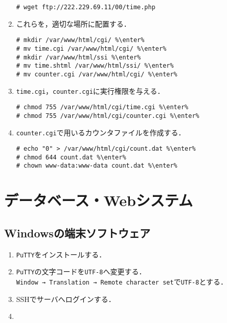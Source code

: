 \documentclass{jlreq}
\begin{document}
\begin{enumerate}
\begin{lstlisting}
# wget ftp://222.229.69.11/00/time.php
\end{lstlisting}
    \item これらを，適切な場所に配置する．
          \begin{lstlisting}
# mkdir /var/www/html/cgi/ %\enter%
# mv time.cgi /var/www/html/cgi/ %\enter%
# mkdir /var/www/html/ssi %\enter%
# mv time.shtml /var/www/html/ssi/ %\enter%
# mv counter.cgi /var/www/html/cgi/ %\enter%
\end{lstlisting}
    \item \texttt{time.cgi}，\texttt{counter.cgi}に実行権限を与える．
          \begin{lstlisting}
# chmod 755 /var/www/html/cgi/time.cgi %\enter%
# chmod 755 /var/www/html/cgi/counter.cgi %\enter%
\end{lstlisting}
    \item \texttt{counter.cgi}で用いるカウンタファイルを作成する．
          \begin{lstlisting}
# echo "0" > /var/www/html/cgi/count.dat %\enter%
# chmod 644 count.dat %\enter%
# chown www-data:www-data count.dat %\enter%
\end{lstlisting}
\end{enumerate}
\clearpage
\section{データベース・Webシステム}
\subsection{Windowsの端末ソフトウェア}
\begin{enumerate}
    \item \texttt{PuTTY}をインストールする．
    \item \texttt{PuTTY}の文字コードを\texttt{UTF-8}へ変更する．\\
          \texttt{Window → Translation → Remote character set}で\texttt{UTF-8}とする．
    \item SSHでサーバへログインする．
    \item
\end{enumerate}
\end{document}
